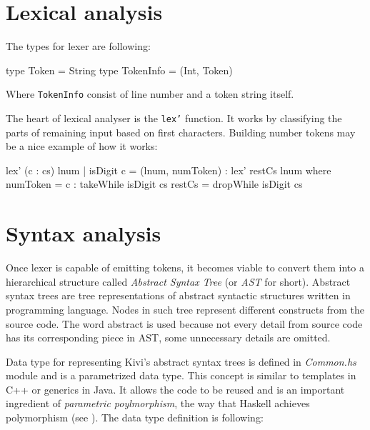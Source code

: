 \documentclass[12pt,a4paper]{report}
\begin{document}
\section{Lexical analysis}

The types for lexer are following:

\vspace*{0.2in}
\begin{code}[style=haskell]
  type Token = String
  type TokenInfo = (Int, Token)
\end{code}

Where \texttt{TokenInfo} consist of line number and a token string itself.

The heart of lexical analyser is the \texttt{lex'} function. It works by
classifying the parts of remaining input based on first characters.  Building
number tokens may be a nice example of how it works:

\vspace*{0.2in}
\begin{code}[style=haskell,label=lst:lex_comment,caption={Building tokens from numbers.}]
  lex' (c : cs) lnum | isDigit c =
      (lnum, numToken) : lex' restCs lnum
      where
          numToken = c : takeWhile isDigit cs
          restCs = dropWhile isDigit cs
\end{code}


\section{Syntax analysis}
\label{sec:syntax_analysis}
Once lexer is capable of emitting tokens, it becomes viable to convert them
into a hierarchical structure called \textit{Abstract Syntax Tree} (or
\textit{AST} for short). Abstract syntax trees are tree representations of
abstract syntactic structures written in programming language. Nodes in such
tree represent different constructs from the source code. The word abstract is
used because not every detail from source code has its corresponding piece in
AST, some unnecessary details are omitted.

Data type for representing Kivi's abstract syntax trees is defined in
\textit{Common.hs} module and is a parametrized data type. This concept is
similar to templates in C++ or generics in Java. It allows the code to be
reused and is an important ingredient of \textit{parametric poylmorphism}, the
way that Haskell achieves polymorphism (see
\cite{website:parametric_polymorphism}). The data type definition is following:
\end{document}
